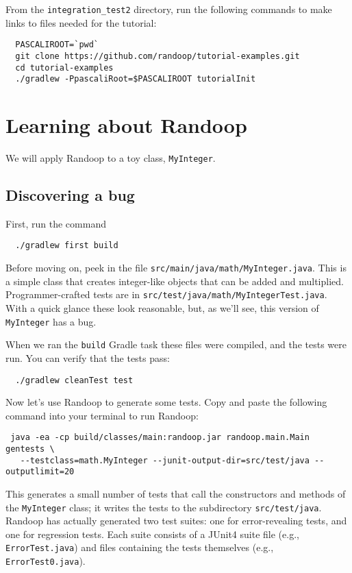 \documentclass[11pt, oneside]{article} %
\newcommand{\code}[1]{{\texttt{#1}}}
\newcommand{\cmd}[1]{{\texttt{#1}}}
\begin{document}
From the \texttt{integration\_test2} directory, run the
following commands to make links to files needed for the tutorial:
\begin{verbatim}
  PASCALIROOT=`pwd`
  git clone https://github.com/randoop/tutorial-examples.git
  cd tutorial-examples
  ./gradlew -PpascaliRoot=$PASCALIROOT tutorialInit 
\end{verbatim}

\section{Learning about Randoop}\label{thebasics}
We will apply Randoop to a toy class, \texttt{MyInteger}.

\subsection{Discovering a bug}
First, run the command
\begin{verbatim}
  ./gradlew first build
\end{verbatim}

Before moving on, peek in the file \texttt{src/main/java/math/MyInteger.java}.
This is a simple class that creates integer-like objects that can be added and multiplied.
Programmer-crafted tests are in \texttt{src/test/java/math/MyIntegerTest.java}.
With a quick glance these look reasonable, but, as we'll see, this version of \code{MyInteger} has a bug.

When we ran the \cmd{build} Gradle task these files were compiled, and the tests were run.
You can verify that the tests pass:
\begin{verbatim}
  ./gradlew cleanTest test
\end{verbatim}

Now let's use Randoop to generate some tests.
Copy and paste the following command into your terminal to run Randoop:
\begin{verbatim}
 java -ea -cp build/classes/main:randoop.jar randoop.main.Main gentests \
   --testclass=math.MyInteger --junit-output-dir=src/test/java --outputlimit=20
\end{verbatim}
This generates a small number of tests that call the constructors and
methods of the \texttt{MyInteger} class; it writes the tests to the subdirectory \texttt{src/test/java}.
Randoop has actually generated two test suites: one for error-revealing tests, and one for regression tests.
Each suite consists of a JUnit4 suite file (e.g., \texttt{ErrorTest.java})
and files containing the tests themselves (e.g., \texttt{ErrorTest0.java}).
\end{document}

